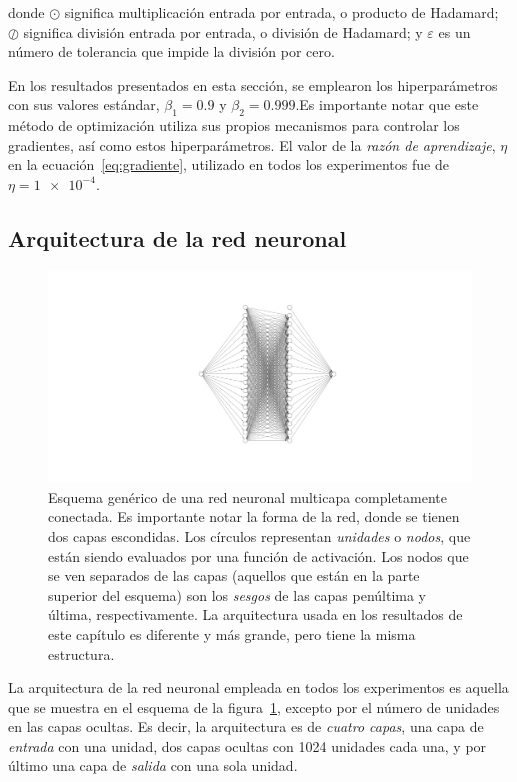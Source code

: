 donde $\odot$ significa multiplicación entrada por entrada, o producto de Hadamard;
$\oslash$ significa división entrada por entrada, o división de Hadamard;
y $\varepsilon$ es un número de tolerancia que impide la división por cero.

En los resultados presentados en esta sección, se emplearon los hiperparámetros con sus
valores estándar, $\beta_1=\num{0.9}$ y $\beta_2=\num{0.999}$.Es importante notar que
este método de optimización utiliza sus propios mecanismos para controlar los gradientes,
así como estos hiperparámetros. El valor de la \emph{razón de aprendizaje}, $\eta$
en la ecuación~\eqref{eq:gradiente}, utilizado en todos los experimentos fue de
$\eta=\num{1e-4}$.

\subsection{Arquitectura de la red neuronal}

\begin{figure}[t]
    \includegraphics[width=\textwidth]{figuras/capitulo-3/neural-network.pdf}
    \vspace{-1.5cm}
    \caption[Esquema genérico de una red neuronal.]{Esquema genérico de una red neuronal multicapa completamente conectada. Es importante notar la forma de la red, donde se tienen dos capas escondidas. Los círculos representan \emph{unidades} o \emph{nodos}, que están siendo evaluados por una función de activación. Los nodos que se ven separados de las capas (aquellos que están en la parte superior del esquema) son los \emph{sesgos} de las capas penúltima y última, respectivamente. La arquitectura usada en los resultados de este capítulo es diferente y más grande, pero tiene la misma estructura.}
    \label{fig:nn-esquema}
\end{figure}

La arquitectura de la red neuronal empleada en todos los experimentos es aquella que se
muestra en el esquema de la figura~\ref{fig:nn-esquema}, excepto por el número de unidades
en las capas ocultas.
Es decir, la arquitectura es de \emph{cuatro capas}, una capa de \emph{entrada} con una
unidad, dos capas ocultas con 1024 unidades cada una, y por último una capa de \emph{salida}
con una sola unidad.

